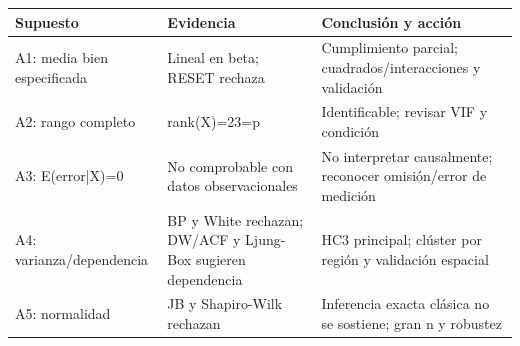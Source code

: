 \begin{tabular}{@{}p{}p{}p{}@{}}
\toprule
Supuesto & Evidencia & Conclusión y acción \\
\midrule
A1: media bien especificada & Lineal en beta; RESET rechaza & Cumplimiento parcial; cuadrados/interacciones y validación \\
A2: rango completo & rank(X)=23=p & Identificable; revisar VIF y condición \\
A3: E(error|X)=0 & No comprobable con datos observacionales & No interpretar causalmente; reconocer omisión/error de medición \\
A4: varianza/dependencia & BP y White rechazan; DW/ACF y Ljung-Box sugieren dependencia & HC3 principal; clúster por región y validación espacial \\
A5: normalidad & JB y Shapiro-Wilk rechazan & Inferencia exacta clásica no se sostiene; gran n y robustez \\
\bottomrule
\end{tabular}
